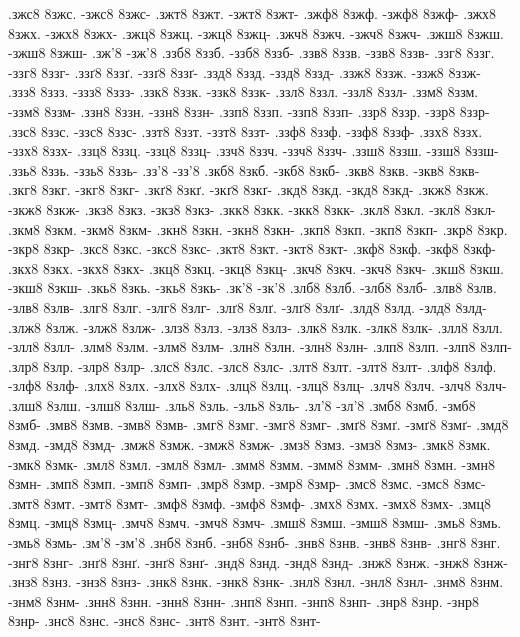 {.зжс8 8зжс. -зжс8 8зжс-
.зжт8 8зжт. -зжт8 8зжт-
.зжф8 8зжф. -зжф8 8зжф-
.зжх8 8зжх. -зжх8 8зжх-
.зжц8 8зжц. -зжц8 8зжц-
.зжч8 8зжч. -зжч8 8зжч-
.зжш8 8зжш. -зжш8 8зжш-
.зж'8 -зж'8
.ззб8 8ззб. -ззб8 8ззб-
.ззв8 8ззв. -ззв8 8ззв-
.ззг8 8ззг. -ззг8 8ззг-
.ззґ8 8ззґ. -ззґ8 8ззґ-
.ззд8 8ззд. -ззд8 8ззд-
.ззж8 8ззж. -ззж8 8ззж-
.ззз8 8ззз. -ззз8 8ззз-
.ззк8 8ззк. -ззк8 8ззк-
.ззл8 8ззл. -ззл8 8ззл-
.ззм8 8ззм. -ззм8 8ззм-
.ззн8 8ззн. -ззн8 8ззн-
.ззп8 8ззп. -ззп8 8ззп-
.ззр8 8ззр. -ззр8 8ззр-
.ззс8 8ззс. -ззс8 8ззс-
.ззт8 8ззт. -ззт8 8ззт-
.ззф8 8ззф. -ззф8 8ззф-
.ззх8 8ззх. -ззх8 8ззх-
.ззц8 8ззц. -ззц8 8ззц-
.ззч8 8ззч. -ззч8 8ззч-
.ззш8 8ззш. -ззш8 8ззш-
.ззь8 8ззь. -ззь8 8ззь-
.зз'8 -зз'8
.зкб8 8зкб. -зкб8 8зкб-
.зкв8 8зкв. -зкв8 8зкв-
.зкг8 8зкг. -зкг8 8зкг-
.зкґ8 8зкґ. -зкґ8 8зкґ-
.зкд8 8зкд. -зкд8 8зкд-
.зкж8 8зкж. -зкж8 8зкж-
.зкз8 8зкз. -зкз8 8зкз-
.зкк8 8зкк. -зкк8 8зкк-
.зкл8 8зкл. -зкл8 8зкл-
.зкм8 8зкм. -зкм8 8зкм-
.зкн8 8зкн. -зкн8 8зкн-
.зкп8 8зкп. -зкп8 8зкп-
.зкр8 8зкр. -зкр8 8зкр-
.зкс8 8зкс. -зкс8 8зкс-
.зкт8 8зкт. -зкт8 8зкт-
.зкф8 8зкф. -зкф8 8зкф-
.зкх8 8зкх. -зкх8 8зкх-
.зкц8 8зкц. -зкц8 8зкц-
.зкч8 8зкч. -зкч8 8зкч-
.зкш8 8зкш. -зкш8 8зкш-
.зкь8 8зкь. -зкь8 8зкь-
.зк'8 -зк'8
.злб8 8злб. -злб8 8злб-
.злв8 8злв. -злв8 8злв-
.злг8 8злг. -злг8 8злг-
.злґ8 8злґ. -злґ8 8злґ-
.злд8 8злд. -злд8 8злд-
.злж8 8злж. -злж8 8злж-
.злз8 8злз. -злз8 8злз-
.злк8 8злк. -злк8 8злк-
.злл8 8злл. -злл8 8злл-
.злм8 8злм. -злм8 8злм-
.злн8 8злн. -злн8 8злн-
.злп8 8злп. -злп8 8злп-
.злр8 8злр. -злр8 8злр-
.злс8 8злс. -злс8 8злс-
.злт8 8злт. -злт8 8злт-
.злф8 8злф. -злф8 8злф-
.злх8 8злх. -злх8 8злх-
.злц8 8злц. -злц8 8злц-
.злч8 8злч. -злч8 8злч-
.злш8 8злш. -злш8 8злш-
.зль8 8зль. -зль8 8зль-
.зл'8 -зл'8
.змб8 8змб. -змб8 8змб-
.змв8 8змв. -змв8 8змв-
.змг8 8змг. -змг8 8змг-
.змґ8 8змґ. -змґ8 8змґ-
.змд8 8змд. -змд8 8змд-
.змж8 8змж. -змж8 8змж-
.змз8 8змз. -змз8 8змз-
.змк8 8змк. -змк8 8змк-
.змл8 8змл. -змл8 8змл-
.змм8 8змм. -змм8 8змм-
.змн8 8змн. -змн8 8змн-
.змп8 8змп. -змп8 8змп-
.змр8 8змр. -змр8 8змр-
.змс8 8змс. -змс8 8змс-
.змт8 8змт. -змт8 8змт-
.змф8 8змф. -змф8 8змф-
.змх8 8змх. -змх8 8змх-
.змц8 8змц. -змц8 8змц-
.змч8 8змч. -змч8 8змч-
.змш8 8змш. -змш8 8змш-
.змь8 8змь. -змь8 8змь-
.зм'8 -зм'8
.знб8 8знб. -знб8 8знб-
.знв8 8знв. -знв8 8знв-
.знг8 8знг. -знг8 8знг-
.знґ8 8знґ. -знґ8 8знґ-
.знд8 8знд. -знд8 8знд-
.знж8 8знж. -знж8 8знж-
.знз8 8знз. -знз8 8знз-
.знк8 8знк. -знк8 8знк-
.знл8 8знл. -знл8 8знл-
.знм8 8знм. -знм8 8знм-
.знн8 8знн. -знн8 8знн-
.знп8 8знп. -знп8 8знп-
.знр8 8знр. -знр8 8знр-
.знс8 8знс. -знс8 8знс-
.знт8 8знт. -знт8 8знт-
}
